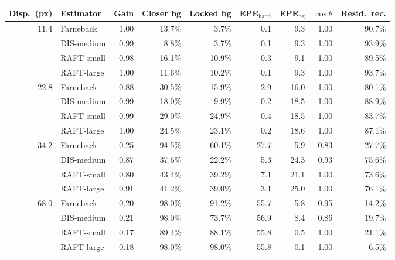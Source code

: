 \begin{tabular}{@{}rlrrrrrrr@{}}
\toprule
Disp.\ (px) & Estimator & Gain & Closer bg & Locked bg & EPE$_{\mathrm{hand}}$ & EPE$_{\mathrm{bg}}$ & $\cos\theta$ & Resid.\ rec. \\
\midrule
11.4 & Farneback & 1.00 & 13.7\% & 3.7\% & 0.1 & 9.3 & 1.00 & 90.7\% \\
 & DIS-medium & 0.99 & 8.8\% & 3.7\% & 0.1 & 9.3 & 1.00 & 93.9\% \\
 & RAFT-small & 0.98 & 16.1\% & 10.9\% & 0.3 & 9.1 & 1.00 & 89.5\% \\
 & RAFT-large & 1.00 & 11.6\% & 10.2\% & 0.1 & 9.3 & 1.00 & 93.7\% \\
\midrule
22.8 & Farneback & 0.88 & 30.5\% & 15.9\% & 2.9 & 16.0 & 1.00 & 80.1\% \\
 & DIS-medium & 0.99 & 18.0\% & 9.9\% & 0.2 & 18.5 & 1.00 & 88.9\% \\
 & RAFT-small & 0.99 & 29.0\% & 24.9\% & 0.4 & 18.5 & 1.00 & 83.7\% \\
 & RAFT-large & 1.00 & 24.5\% & 23.1\% & 0.2 & 18.6 & 1.00 & 87.1\% \\
\midrule
34.2 & Farneback & 0.25 & 94.5\% & 60.1\% & 27.7 & 5.9 & 0.83 & 27.7\% \\
 & DIS-medium & 0.87 & 37.6\% & 22.2\% & 5.3 & 24.3 & 0.93 & 75.6\% \\
 & RAFT-small & 0.80 & 43.4\% & 39.2\% & 7.1 & 21.1 & 1.00 & 73.6\% \\
 & RAFT-large & 0.91 & 41.2\% & 39.0\% & 3.1 & 25.0 & 1.00 & 76.1\% \\
\midrule
68.0 & Farneback & 0.20 & 98.0\% & 91.2\% & 55.7 & 5.8 & 0.95 & 14.2\% \\
 & DIS-medium & 0.21 & 98.0\% & 73.7\% & 56.9 & 8.4 & 0.86 & 19.7\% \\
 & RAFT-small & 0.17 & 89.4\% & 88.1\% & 55.8 & 0.5 & 1.00 & 21.1\% \\
 & RAFT-large & 0.18 & 98.0\% & 98.0\% & 55.8 & 0.1 & 1.00 & 6.5\% \\
\bottomrule
\end{tabular}
